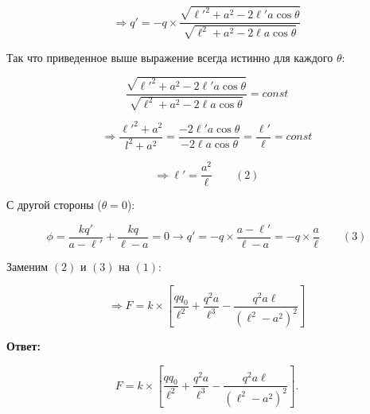 $$\Longrightarrow q' = -q \times \frac{\sqrt{\ell'^2+a^2-2\ell' a \cos{\theta} }}{\sqrt{\ell^2+a^2-2\ell a \cos{\theta} }}$$

Так что приведенное выше выражение всегда истинно для каждого $\theta$:

$$\frac{\sqrt{\ell'^2+a^2-2\ell' a \cos{\theta} }}{\sqrt{\ell^2+a^2-2\ell a \cos{\theta} }} = const$$

$$\Longrightarrow \frac{\ell'^2 + a^2}{l^2 + a^2} = \frac{-2 \ell' a \cos{\theta}}{-2 \ell a \cos{\theta}} = \frac{\ell'}{\ell} = const$$

$$\Longrightarrow \ell' = \frac{a^2}{\ell} \qquad (2)$$

С другой стороны ($\theta = 0$):

$$\phi = \frac{kq'}{a-\ell'} + \frac{kq}{\ell -a}=0 \xrightarrow{} q' = -q \times \frac{a-\ell'}{\ell-a} = -q \times \frac{a}{\ell} \qquad (3)$$

Заменим $(2)$ и $(3)$ на $(1)$:

$$\Longrightarrow F = k \times [\frac{qq_0}{\ell^2} + \frac{q^2a}{\ell^3} - \frac{q^2a \ell}{(\ell^2-a^2)^2}]$$

\textbf{Ответ:}

$$F = k \times [\frac{qq_0}{\ell^2} + \frac{q^2a}{\ell^3} - \frac{q^2a \ell}{(\ell^2-a^2)^2}].$$





